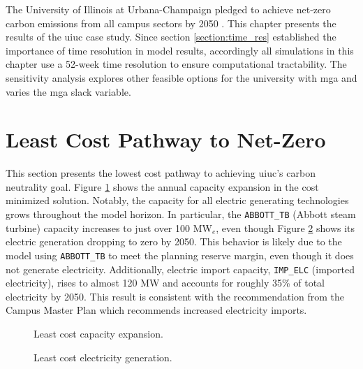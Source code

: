 The University of Illinois at Urbana-Champaign pledged to achieve net-zero carbon
emissions from all campus sectors by 2050
\cite{institute_for_sustainability_energy_and_environment_illinois_2015}. This
chapter presents the results of the \gls{uiuc} case study. Since section
\ref{section:time_res} established the importance of time resolution in model results,
accordingly all simulations in this chapter use a 52-week time resolution to ensure
computational tractability. The sensitivity analysis explores other feasible options
for the university with \gls{mga} and varies the \gls{mga} slack variable.

\section{Least Cost Pathway to Net-Zero}
This section presents the lowest cost pathway to achieving \gls{uiuc}'s carbon
neutrality goal.
Figure \ref{fig:uiuc_elc_cap} shows the annual capacity expansion in the cost
minimized solution. Notably, the capacity for all electric generating technologies
grows throughout the model horizon. In particular, the \texttt{ABBOTT\_TB}
(Abbott steam turbine) capacity
increases to just over 100 MW$_e$, even though Figure \ref{fig:uiuc_elc_gen}
shows its electric generation dropping to zero by 2050. This behavior is likely due to
the model using \texttt{ABBOTT\_TB} to meet the planning
reserve margin, even though it does not generate electricity. Additionally,
electric import capacity, \texttt{IMP\_ELC} (imported electricity), rises
to almost 120 MW and accounts for roughly 35\% of total electricity by 2050.
This result is consistent with the recommendation from the Campus Master Plan
\cite{affiliated_engineers_inc_utilities_2015} which recommends increased
electricity imports.

\begin{figure}[H]
    \centering
    \resizebox{0.55\columnwidth}{!}{}
    \caption{Least cost capacity expansion.}
    \label{fig:uiuc_elc_cap}
\end{figure}

\begin{figure}[H]
    \centering
    \resizebox{0.55\columnwidth}{!}{}
    \caption{Least cost electricity generation.}
    \label{fig:uiuc_elc_gen}
\end{figure}



